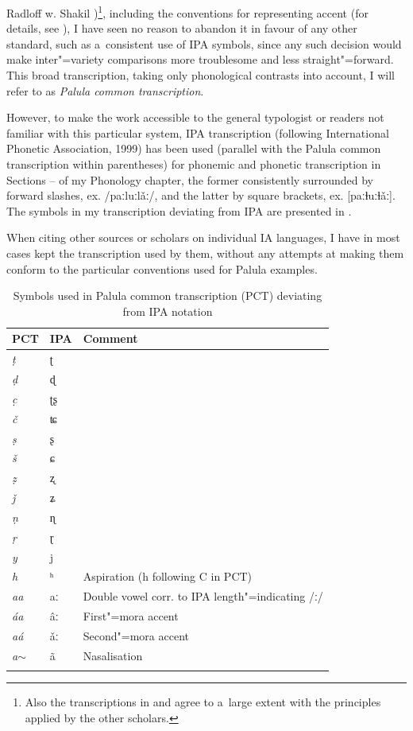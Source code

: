 {Radloff w. Shakil \citeyear{radloffshakil1998})\footnote{Also the transcriptions in
    \citet{hook1990a,hook1996} and \citet{hookzia2005} agree to a~large extent with the principles
    applied by the other scholars.}, including the conventions for representing accent (for details,
  see ), I have seen no reason to abandon it in favour of any other standard, such as
  a~consistent use of IPA symbols, since any such decision would make inter"=variety comparisons more
  troublesome and less straight"=forward. This broad transcription, taking only phonological contrasts
  into account, I will refer to as \textit{Palula common transcription}.


However, to make the work accessible to the general typologist or readers not familiar with this
particular system, IPA transcription (following International Phonetic Association, 1999) has been
used (parallel with the Palula common transcription within parentheses) for phonemic and phonetic
transcription in Sections -- of my Phonology chapter, the former consistently surrounded
by forward slashes, ex. /paːluːlǎː/, and the latter by square brackets, ex. [paːɫuːɫǎː]. The
symbols in my transcription deviating from IPA are presented in .


When citing other sources or scholars on individual IA languages, I have in most cases kept the
transcription used by them, without any attempts at making them conform to the particular
conventions used for Palula examples.


\begin{table}[ht]
\caption{Symbols used in Palula common transcription (PCT) deviating from IPA notation}
\begin{tabularx}{.8\textwidth}{ l l | Q }
\lsptoprule
PCT &
IPA &
Comment\\\hline
\textit{ṭ} &
ʈ &
\\
\textit{ḍ} &
ɖ &
\\
\textit{c̣} &
ʈʂ &
\\
\textit{č} &
ʨ &
\\
\textit{ṣ} &
ʂ &
\\
\textit{š} &
ɕ &
\\
\textit{ẓ} &
ʐ &
\\
\textit{ǰ} &
ʑ &\\


\textit{ṇ} &
ɳ &
\\
\textit{ṛ} &
ɽ &
\\
\textit{y} &
j &
\\
\textit{h} &
ʰ &
Aspiration (h following C in PCT)
\\
\textit{aa} &
aː &
Double vowel corr. to IPA length"=indicating /ː/
\\
\textit{áa} &
âː &
First"=mora accent
\\
\textit{aá} &
ǎː &
Second"=mora accent
\\
\textit{a}$\sim$ &
ã &
Nasalisation\\\lspbottomrule
\end{tabularx}
\label{tab:1-5}
\end{table}

}
